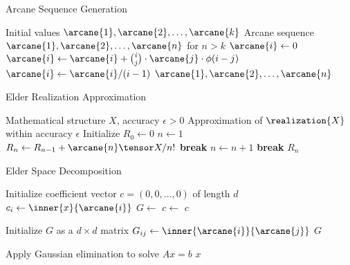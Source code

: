 
\begin{algorithm}[H]
\caption{Arcane Sequence Generation}
\begin{algorithmic}[1]
\Input Initial values $\arcane{1}, \arcane{2}, \ldots, \arcane{k}$
\Output Arcane sequence $\arcane{1}, \arcane{2}, \ldots, \arcane{n}$ for $n > k$
    \State $\arcane{i} \gets 0$
        \State $\arcane{i} \gets \arcane{i} + \binom{i}{j} \cdot \arcane{j} \cdot \phi(i-j)$
    \EndFor
    \State $\arcane{i} \gets \arcane{i} / (i-1)$
\EndFor
\State \Return $\arcane{1}, \arcane{2}, \ldots, \arcane{n}$
\end{algorithmic}
\end{algorithm}

\begin{algorithm}[H]
\caption{Elder Realization Approximation}
\begin{algorithmic}[1]
\Input Mathematical structure $X$, accuracy $\epsilon > 0$
\Output Approximation of $\realization{X}$ within accuracy $\epsilon$
\State Initialize $R_0 \gets 0$
\State $n \gets 1$
    \State $R_n \gets R_{n-1} + \arcane{n} \tensor X / n!$
        \State \textbf{break}
    \EndIf
    \State $n \gets n + 1$
     
        \State \textbf{break}
    \EndIf
\EndWhile
\State \Return $R_n$
\end{algorithmic}
\end{algorithm}

\begin{algorithm}[H]
\caption{Elder Space Decomposition}
\begin{algorithmic}[1]
    \State Initialize coefficient vector $c = (0, 0, \ldots, 0)$ of length $d$
        \State $c_i \gets \inner{x}{\arcane{i}}$
    \EndFor
    \State $G \gets$ 
    \State $c \gets$ 
    \State \Return $c$
\EndProcedure

    \State Initialize $G$ as a $d \times d$ matrix
            \State $G_{ij} \gets \inner{\arcane{i}}{\arcane{j}}$
        \EndFor
    \EndFor
    \State \Return $G$
\EndFunction

    \State Apply Gaussian elimination to solve $Ax = b$
    \State \Return $x$
\EndFunction
\end{algorithmic}
\end{algorithm}
